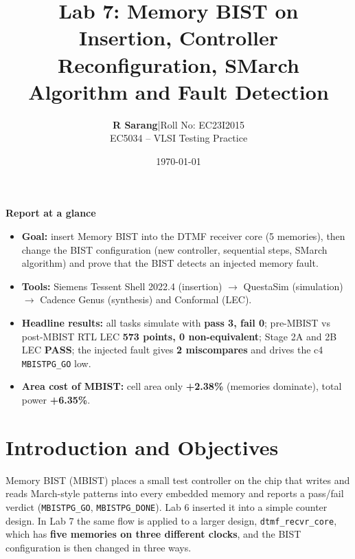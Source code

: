 \documentclass[11pt]{article}
\title{\vspace{-1em}\textbf{\color{navy}Lab 7: Memory BIST on \code{dtmf\_recvr\_core}}\\[2pt]
\large Insertion, Controller Reconfiguration, SMarch Algorithm and Fault Detection}
\author{\textbf{R Sarang}\quad|\quad Roll No: EC23I2015\\
        EC5034 -- VLSI Testing Practice}
\date{\today}
\newcommand{\code}[1]{\texttt{\small #1}}
\begin{document}
\maketitle
\vspace{-1.2em}

\begin{tcolorbox}[enhanced, colback=paper, colframe=navy!40, boxrule=0.5pt, arc=2pt]
\textbf{Report at a glance}
\begin{itemize}[leftmargin=1.4em, itemsep=1pt]
  \item \textbf{Goal:} insert Memory BIST into the DTMF receiver core (5 memories), then change the BIST
        configuration (new controller, sequential steps, SMarch algorithm) and prove that the BIST detects an injected memory fault.
  \item \textbf{Tools:} Siemens Tessent Shell 2022.4 (insertion) $\rightarrow$ QuestaSim (simulation)
        $\rightarrow$ Cadence Genus (synthesis) and Conformal (LEC).
  \item \textbf{Headline results:} all tasks simulate with \textbf{pass 3, fail 0}; pre-MBIST vs post-MBIST RTL LEC
        \textbf{573 points, 0 non-equivalent}; Stage 2A and 2B LEC \textbf{PASS}; the injected fault gives
        \textbf{2 miscompares} and drives the c4 \code{MBISTPG\_GO} low.
  \item \textbf{Area cost of MBIST:} cell area only \textbf{+2.38\%} (memories dominate), total power \textbf{+6.35\%}.
\end{itemize}
\end{tcolorbox}

\tableofcontents
\newpage

\section{Introduction and Objectives}

Memory BIST (MBIST) places a small test controller on the chip that writes and reads March-style patterns into every
embedded memory and reports a pass/fail verdict (\code{MBISTPG\_GO}, \code{MBISTPG\_DONE}). Lab 6 inserted it into a
simple counter design. In Lab 7 the same flow is applied to a larger design, \code{dtmf\_recvr\_core}, which has
\textbf{five memories on three different clocks}, and the BIST configuration is then changed in three ways.
\end{document}
